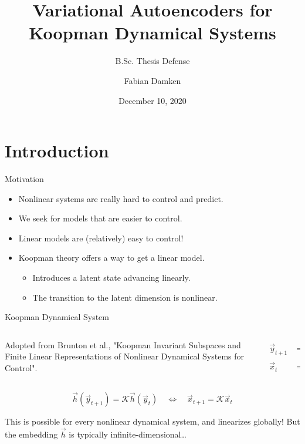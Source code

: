 \documentclass[
	aspectratio=43,
	color={accentcolor=1c},
	logo=false,
	colorframetitle=true,
]{tudabeamer}
\title{Variational Autoencoders for Koopman Dynamical Systems}
\subtitle{B.Sc. Thesis Defense}
\author{Fabian Damken}
\institute{Intelligent Autonomous Systems}
\date{December 10, 2020}
\begin{document}
	\maketitle

	\section{Introduction}
		\begin{frame}{Motivation}
			\begin{itemize}
				\item Nonlinear systems are really hard to control and predict.
				\item We seek for models that are easier to control.
				\item Linear models are (relatively) easy to control!
				\item Koopman theory offers a way to get a linear model.
					\begin{itemize}
						\item Introduces a latent state advancing linearly.
						\item The transition to the latent dimension is nonlinear.
					\end{itemize}
			\end{itemize}
		\end{frame}

		\begin{frame}[c]{Koopman Dynamical System}
			\vspace{-0.5cm}
			\begin{columns}[c]
				\begin{column}{0.85\linewidth}
					\begin{center}
						\resizebox{\linewidth}{!}{\tikzKoopmanOperator}
					\end{center}
					\vspace{-0.5cm}
					\begin{center}
						\footnotesize
						Adopted from Brunton et al., "Koopman Invariant Subspaces and Finite Linear Representations of Nonlinear Dynamical Systems for Control".
					\end{center}
				\end{column}
				\begin{column}{0.15\linewidth}
					\begin{align*}
						\vec{y}_{t + 1} &= \vec{F}(\vec{y}_t) \\
						      \vec{x}_t &= \vec{h}(\vec{y}_t)
					\end{align*}
				\end{column}
			\end{columns}
			\vspace{0.5cm}

			\begin{equation*}
				\vec{h}(\vec{y}_{t + 1}) = \mathcal{K} \vec{h}(\vec{y}_t)
				\quad\iff\quad
				\vec{x}_{t + 1} = \mathcal{K} \vec{x}_t
			\end{equation*}

			This is possible for every nonlinear dynamical system, and linearizes globally! But the embedding \(\vec{h}\) is typically infinite-dimensional\dots
		\end{frame}
\end{document}
